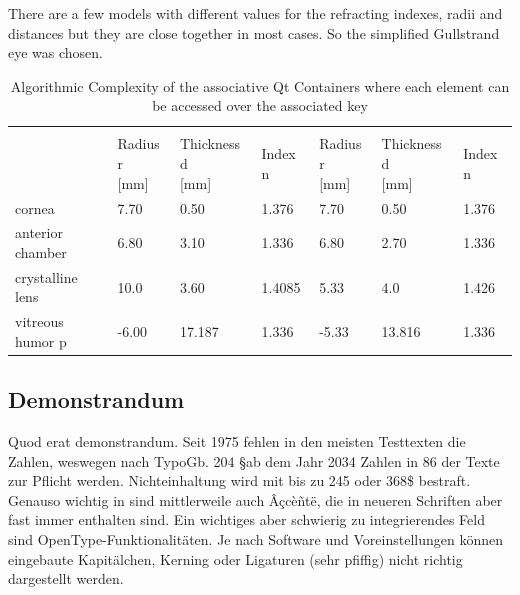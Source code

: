 There are a few models with different values for the refracting indexes, radii and distances but they are close together in most cases. So the simplified Gullstrand eye was chosen.
\begin{table}[!htb]
\centering
\begin{tabular}{@{}|l|l|l|l|l|l|l|@{}}
	\hline
	
	\multirow{2}{*}{} & \multicolumn{3}{l|}{\thead{Relaxed}} & \multicolumn{3}{l|}{\thead{Accomodated}} \\ \hhline{~------}
	\thead{ Notaton\\{}} &  \thead{Radius r \\ {}[mm] }        & \thead{Thickness d\\ {}[mm]}    & \thead{Index n\\ {}}        & \thead{Radius r \\ {}[mm] }& \thead{Thickness d \\ {}[mm] }& \thead{Index n\\{} }    \\ \hline
	cornea     &  7.70        & 0.50      & 1.376       &  7.70   &0.50  & 1.376\\ \hline
	anterior chamber & 6.80        & 3.10     & 1.336       & 6.80    & 2.70&1.336 \\ \hline
	crystalline lens     &  10.0    & 3.60          & 1.4085    & 5.33   &   4.0  &  1.426 \\ \hline
	vitreous humor    p  & -6.00      & 17.187         & 1.336    & -5.33  & 13.816  &  1.336  \\ \hline
\end{tabular}
\caption{Algorithmic Complexity of the associative Qt Containers where each element can be accessed over the associated key}
\label{tab:qt-container-associative}
\end{table}


\subsection{Demonstrandum}
\label{subsec:satzspiegeltest_typoblindtext_demonstrandum}

Quod erat demonstrandum. Seit 1975 fehlen in den meisten Testtexten die Zahlen, weswegen nach TypoGb. 204 \S ab dem Jahr 2034 Zahlen in 86 der Texte zur Pflicht werden. Nichteinhaltung wird mit bis zu 245 \texteuro oder 368\$ bestraft. Genauso wichtig in sind mittlerweile auch \^A\c{c}c\`e\~nt\"e, die in neueren Schriften aber fast immer enthalten sind. Ein wichtiges aber schwierig zu integrierendes Feld sind OpenType-Funktionalit\"aten. Je nach Software und Voreinstellungen k\"onnen eingebaute Kapit\"alchen, Kerning oder Ligaturen (sehr pfiffig) nicht richtig dargestellt werden.

